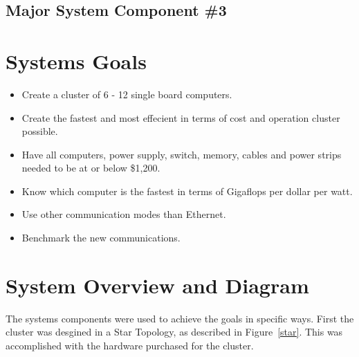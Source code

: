 \subsection{Major System Component \#3}

\section{Systems Goals}

\begin{itemize}
	\item Create a cluster of 6 - 12 single board computers.
	\item Create the fastest and most effecient in terms of cost and operation cluster possible.
	\item Have all computers, power supply, switch, memory, cables and power strips needed to be at or below \$1,200.
	\item Know which computer is the fastest in terms of Gigaflops per dollar per watt.
	\item Use other communication modes than Ethernet.
	\item Benchmark the new communications.
\end{itemize}

\section{System Overview and Diagram}

The systems components were used to achieve the goals in specific ways. First the cluster was desgined in a Star Topology, as described in Figure~\ref{star}. This was accomplished with the hardware purchased for the cluster.

